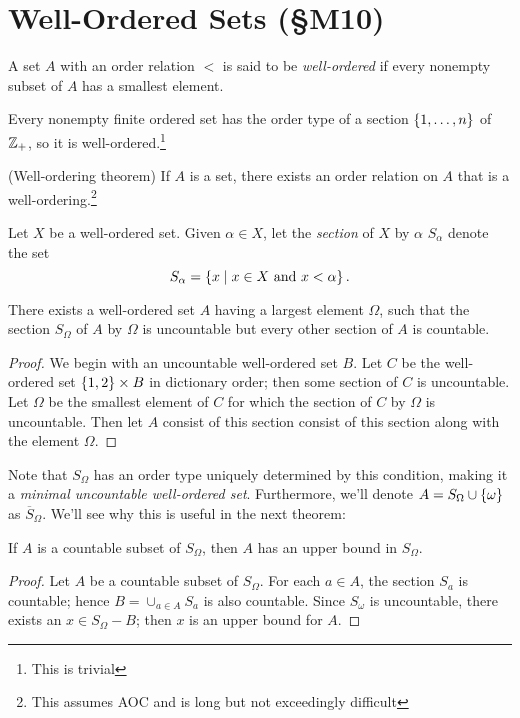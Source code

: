 \documentclass{report}
\begin{document}
\section{Well-Ordered Sets (\S M10)}
\begin{definition}
  A set $A$ with an order relation $<$ is said to be \emph{well-ordered} if every nonempty subset of $A$ has a smallest element.
\end{definition}

\begin{theorem}
  Every nonempty finite ordered set has the order type of a section $\left\{ 1,\dots,n \right\}$ of $\mathbb{Z}_+$, so it is well-ordered.\footnote{This is trivial}
\end{theorem}
 
\begin{theorem}
  {\normalfont (Well-ordering theorem)} If $A$ is a set, there exists an order relation on $A$ that is a well-ordering.\footnote{This assumes AOC and is long but not exceedingly difficult}
\end{theorem}

\begin{definition}
  Let $X$ be a well-ordered set. Given $\alpha \in X$, let the \emph{section} of $X$ by $\alpha$ $S_\alpha$ denote the set
  \[
    S_\alpha = \left\{  x \mid x \in X \text{ and } x < \alpha \right\}.
  \]
\end{definition}

\begin{lemma}
  There exists a well-ordered set $A$ having a largest element $\Omega$, such that the section $S_\Omega$ of $A$ by $\Omega$ is uncountable but every other section of $A$ is countable.
\end{lemma}
\begin{proof}
We begin with an uncountable well-ordered set $B$.
Let  $C$ be the well-ordered set $\left\{ 1,2 \right\} \times B$ in dictionary order; then some section of $C$ is uncountable.
Let $\Omega$ be the smallest element of $C$ for which the section of $C$ by $\Omega$ is uncountable. Then let $A$ consist of this section consist of this section along with the element $\Omega$.
\end{proof}

Note that $S_\Omega$ has an order type uniquely determined by this condition, making it a \emph{minimal uncountable well-ordered set}. 
Furthermore, we'll denote $A = S_\Omega \cup \left\{ \omega \right\}$ as $\overline S_\Omega$.
We'll see why this is useful in the next theorem:
\begin{theorem}
  If $A$ is a countable subset of $S_\Omega$, then $A$ has an upper bound in $S_\Omega$.
\end{theorem}
\begin{proof}
  Let $A$ be a countable subset of $S_\Omega$.
  For each $a \in A$, the section $S_a$ is countable;
  hence $B = \cup_{a \in A} S_a$ is also countable.
  Since $S_\omega$ is uncountable, there exists an $x \in S_\Omega - B$;
  then $x$ is an upper bound for $A$.
\end{proof}
\end{document}
